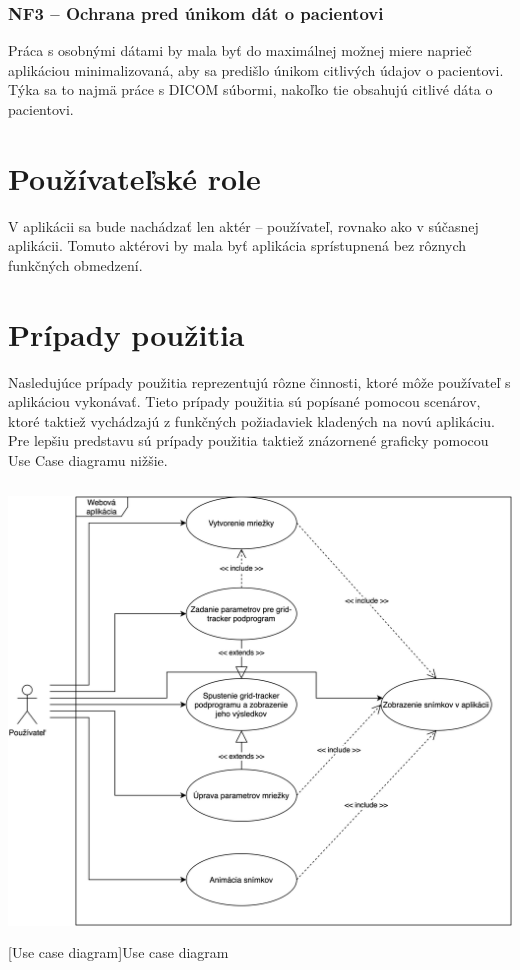 \subsubsection {NF3 -- Ochrana pred únikom dát o pacientovi}
Práca s osobnými dátami by mala byť do maximálnej možnej miere naprieč aplikáciou minimalizovaná, aby sa predišlo únikom citlivých údajov o pacientovi. Týka sa to najmä práce s DICOM súbormi, nakoľko tie obsahujú citlivé dáta o pacientovi.

\section {Používateľské role}
V aplikácii sa bude nachádzať len aktér -- používateľ, rovnako ako v súčasnej aplikácii. Tomuto aktérovi by mala byť aplikácia sprístupnená bez rôznych funkčných obmedzení.

\section {Prípady použitia}
Nasledujúce prípady použitia reprezentujú rôzne činnosti, ktoré môže používateľ s aplikáciou vykonávať. Tieto prípady použitia sú popísané pomocou scenárov, ktoré taktiež vychádzajú z funkčných požiadaviek kladených na novú aplikáciu. Pre lepšiu predstavu sú prípady použitia taktiež znázornené graficky pomocou Use Case diagramu nižšie.

\begin {center}
        \centering
        \includegraphics[height=12cm]{media/graphs/usecase.png}
        \captionsetup{justification=centering}
        [Use case diagram]{Use case diagram}
\end {center}

